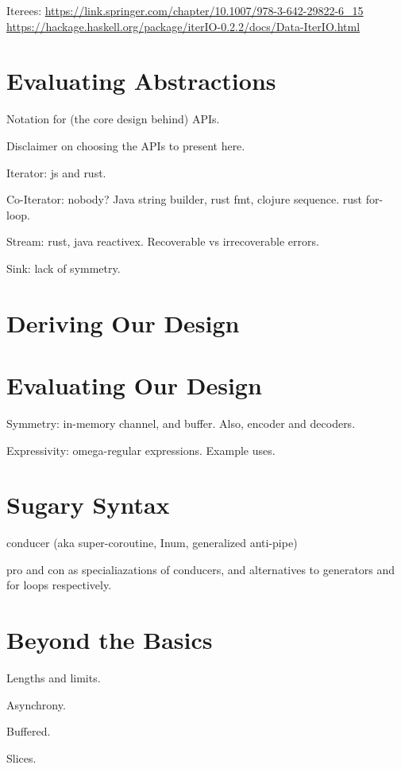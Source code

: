 \documentclass[sigplan,screen,10pt,anonymous,review]{acmart}
\begin{document}
Iterees: 
\url{https://link.springer.com/chapter/10.1007/978-3-642-29822-6_15}
\url{https://hackage.haskell.org/package/iterIO-0.2.2/docs/Data-IterIO.html}

\section{Evaluating Abstractions}\label{evaluating_others}

Notation for (the core design behind) APIs.

Disclaimer on choosing the APIs to present here.

Iterator: js and rust.

Co-Iterator: nobody? Java string builder, rust fmt, clojure sequence. rust for-loop.

Stream: rust, java reactivex. Recoverable vs irrecoverable errors.

Sink: lack of symmetry.

\section{Deriving Our Design}\label{derive}

\section{Evaluating Our Design}\label{evaluating_ours}

Symmetry: in-memory channel, and buffer. Also, encoder and decoders.

Expressivity: omega-regular expressions. Example uses.

\section{Sugary Syntax}\label{syntax}

conducer (aka super-coroutine, Inum, generalized anti-pipe)

pro and con as specialiazations of conducers, and alternatives to generators and for loops respectively.

\section{Beyond the Basics}\label{fun}

Lengths and limits.

Asynchrony.

Buffered.

Slices.
\end{document}
